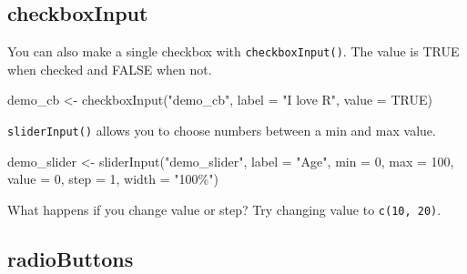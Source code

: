 \documentclass[
  oneside]{book}
\newenvironment{Shaded}{\begin{snugshade}}{\end{snugshade}}
\newcommand{\AttributeTok}[1]{\textcolor[rgb]{0.77,0.63,0.00}{#1}}
\newcommand{\ConstantTok}[1]{\textcolor[rgb]{0.00,0.00,0.00}{#1}}
\newcommand{\DecValTok}[1]{\textcolor[rgb]{0.00,0.00,0.81}{#1}}
\newcommand{\FunctionTok}[1]{\textcolor[rgb]{0.00,0.00,0.00}{#1}}
\newcommand{\NormalTok}[1]{#1}
\newcommand{\OtherTok}[1]{\textcolor[rgb]{0.56,0.35,0.01}{#1}}
\newcommand{\StringTok}[1]{\textcolor[rgb]{0.31,0.60,0.02}{#1}}
\begin{document}
\hypertarget{checkboxinput}{%
\subsection{checkboxInput}\label{checkboxinput}}

You can also make a single checkbox with \texttt{checkboxInput}\texttt{()}. The \AttributeTok{value} is \ConstantTok{TRUE} when checked and \ConstantTok{FALSE} when not.

\begin{Shaded}
\begin{Highlighting}[]
\NormalTok{demo\_cb }\OtherTok{\textless{}{-}} \FunctionTok{checkboxInput}\NormalTok{(}\StringTok{"demo\_cb"}\NormalTok{,}
                         \AttributeTok{label =} \StringTok{"I love R"}\NormalTok{,}
                         \AttributeTok{value =} \ConstantTok{TRUE}\NormalTok{)}
\end{Highlighting}
\end{Shaded}

\texttt{sliderInput}\texttt{()} allows you to choose numbers between a \AttributeTok{min} and \AttributeTok{max} value.

\begin{Shaded}
\begin{Highlighting}[]
\NormalTok{demo\_slider }\OtherTok{\textless{}{-}} \FunctionTok{sliderInput}\NormalTok{(}\StringTok{"demo\_slider"}\NormalTok{,}
                           \AttributeTok{label =} \StringTok{"Age"}\NormalTok{,}
                           \AttributeTok{min =} \DecValTok{0}\NormalTok{,}
                           \AttributeTok{max =} \DecValTok{100}\NormalTok{,}
                           \AttributeTok{value =} \DecValTok{0}\NormalTok{,}
                           \AttributeTok{step =} \DecValTok{1}\NormalTok{,}
                           \AttributeTok{width =} \StringTok{"100\%"}\NormalTok{)}
\end{Highlighting}
\end{Shaded}

\begin{try}
What happens if you change \AttributeTok{value} or \AttributeTok{step}? Try changing \AttributeTok{value} to \texttt{c(10,\ 20)}.

\end{try}

\hypertarget{radiobuttons}{%
\subsection{radioButtons}\label{radiobuttons}}
\end{document}
